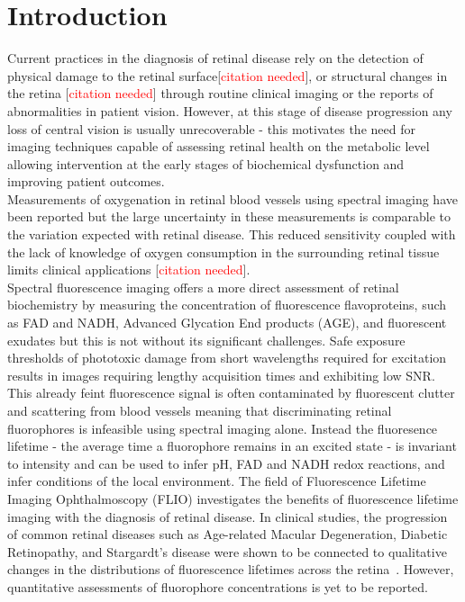 \documentclass{optica-article}
\begin{document}
\section{Introduction}
Current practices in the diagnosis of retinal disease rely on the detection of physical damage to the retinal surface[\textcolor{red}{citation needed}], or structural changes in the retina [\textcolor{red}{citation needed}] through routine clinical imaging or the reports of abnormalities in patient vision. However, at this stage of disease progression any loss of central vision is usually unrecoverable - this motivates the need for imaging techniques capable of assessing retinal health on the metabolic level allowing intervention at the early stages of biochemical dysfunction and improving patient outcomes. 
\\
Measurements of oxygenation in retinal blood vessels using spectral imaging have been reported but the large uncertainty in these measurements is comparable to the variation expected with retinal disease. This reduced sensitivity coupled with the lack of knowledge of oxygen consumption in the surrounding retinal tissue limits clinical applications [\textcolor{red}{citation needed}]. 
\\
Spectral fluorescence imaging offers a more direct assessment of retinal biochemistry by measuring the concentration of fluorescence flavoproteins, such as FAD and NADH, Advanced Glycation End products (AGE), and fluorescent exudates but this is not without its significant challenges. Safe exposure thresholds of phototoxic damage from short wavelengths required for excitation results in images requiring lengthy acquisition times and exhibiting low SNR. This already feint fluorescence signal is often contaminated by fluorescent clutter and scattering from blood vessels meaning that discriminating retinal fluorophores is infeasible using spectral imaging alone.
Instead the fluoresence lifetime - the average time a fluorophore remains in an excited state - is invariant to intensity and can be used to infer pH, FAD and NADH redox reactions, and infer conditions of the local environment. The field of Fluorescence Lifetime Imaging Ophthalmoscopy (FLIO) investigates the benefits of fluorescence lifetime imaging with the diagnosis of retinal disease. In clinical studies, the progression of common retinal diseases such as Age-related Macular Degeneration, Diabetic Retinopathy, and Stargardt's disease were shown to be connected to qualitative changes in the distributions of fluorescence lifetimes across the retina~\cite{schweitzer2007towards, dysli2017fluorescence}. However, quantitative assessments of fluorophore concentrations is yet to be reported.
\\
\end{document}

